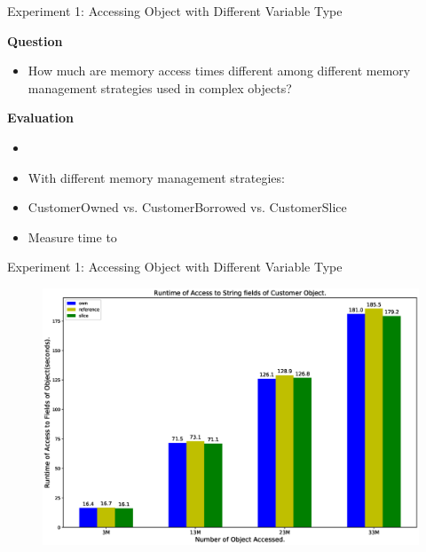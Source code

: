 \documentclass[9pt]{beamer}
\begin{document}

\begin{frame}[fragile]{Experiment 1: Accessing Object with Different Variable Type}

    \textbf{Question}
    \begin{itemize}
        \item How much are memory access times different among different memory management strategies used in complex objects?
    \end{itemize}

    \vspace{0.5cm}

    \textbf{Evaluation}
    \begin{itemize}
        \item {}
        \item With different memory management strategies: 
        \item CustomerOwned vs. CustomerBorrowed vs. CustomerSlice
        \item Measure time to 
    \end{itemize}

\end{frame}


\begin{frame}[t, fragile]{Experiment 1: Accessing Object with Different Variable Type}

    \begin{figure}[hp]
        \centering
        \begin{center}
                \includegraphics[width=1\textwidth]{images/rust_access_different_poniter_init.eps}
                \captionsetup{labelformat=empty}
        \end{center}
    \end{figure}
\end{frame}
\end{document}
